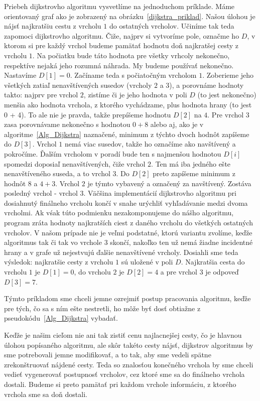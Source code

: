 Priebeh dijkstrovho algoritmu vysvetlíme na jednoduchom príklade. Máme orientovaný graf ako je zobrazený na obrázku~\ref{dijkstra_priklad}. Našou úlohou je nájsť najkratšiu cestu z vrcholu $1$ do ostatných vrcholov. Učiníme tak teda zapomoci dijkstrovho algoritmu. Čiže, najprv si vytvoríme pole, označme ho $D$, v ktorom si pre každý vrchol budeme pamätať hodnotu doň najkratšej cesty z vrcholu $1$. Na počiatku bude táto hodnota pre všetky vrhcoly nekonečno, respektíve nejaká jeho rozumná náhrada. My budeme používať nekonečno. Nastavíme $D [1] = 0$. Začíname teda s počiatočným vrcholom $1$. Zoberieme jeho všetkých zatiaľ nenavštívených susedov (vrcholy $2$ a $3$), a porovnáme hodnoty takto: najprv pre vrchol $2$, zistíme či je jeho hodnota v poli $D$ (to jest nekonečno) menšia ako hodnota vrchola, z ktorého vychádzame, plus hodnota hrany (to jest 0 + 4). To ale nie je pravda, takže prepíšeme hodnotu $D [2]$ na $4$. Pre vrchol $3$ zasa porovnávame nekonečno s hodnotou $0+8$ alebo aj, ako je v algoritme~\ref{Alg_Dijkstra} naznačené, minimum z týchto dvoch hodnôt zapíšeme do $D [3]$. Vrchol $1$ nemá viac susedov, takže ho označíme ako navštívený a pokročíme. Ďalším vrcholom v poradí bude ten s najmenšou hodnotou $D [i]$ spomedzi doposiaľ nenavštívených, čiže vrchol $2$. Ten má iba jedného ešte nenavštíveného suseda, a to vrchol $3$. Do $D [2]$ preto zapíšeme minimum z hodnôt $8$ a $4 + 3$. Vrchol $2$ je týmto vybavený a označený za navštívený. Zostáva posledný vrchol - vrchol $3$. Väčšina implementácií dijkstrovho algoritmu pri dosiahnutý finálneho vrcholu končí v snahe urýchliť vyhľadávanie medzi dvoma vrcholmi. Ak vśak túto podmienku nezakomponujeme do nášho algoritmu, program zráta hodnoty najkratších ciest z daného vrcholu do všetkých ostatných vrcholov. V našom prípade nie je veľmi podstatné, ktorú variantu zvolíme, keďže algoritmus tak či tak vo vrchole $3$ skončí, nakoľko ten už nemá žiadne incidentné hrany a v grafe už nejestvujú ďalšie nenavštívené vrcholy. Dosiahli sme teda výsledok: najkratšie cesty z vrcholu $1$ sú uložené v poli $D$. Najkratšia cesta do vrcholu $1$ je $D [1] = 0$, do vrcholu $2$ je $D [2] = 4$ a pre vrchol $3$ je odpoveď $D [3] = 7$.\newline

Týmto príkladom sme chceli jemne ozrejmiť postup pracovania algoritmu, keďže pre tých, čo sa s ním ešte nestretli, ho môže byť dosť obtiažne z pseudokódu~\ref{Alg_Dijkstra} vybadať.\newline

Keďže je našim cieľom nie ani tak zistiť cenu najlacnejšej cesty, čo je hlavnou úlohou popísaného algoritmu, ale skôr takéto cesty nájsť, dijkstrov algoritmus by sme potrebovali jemne modifikovať, a to tak, aby sme vedeli spätne zrekonštruovať nájdené cesty. Teda so znalosťou konečného vrchola by sme chceli vedieť vygenerovať postupnosť vrcholov, cez ktoré sme sa do finálneho vrchola dostali. Budeme si preto pamätať pri každom vrchole informáciu, z ktorého vrchola sme sa doň dostali.\newline

